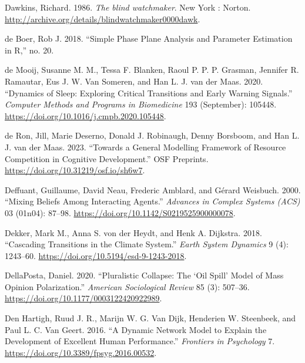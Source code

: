 \documentclass[
  a4paper,
  DIV=11,
  numbers=noendperiod,
  oneside]{scrreprt}
\newlength{\cslhangindent}
\newenvironment{CSLReferences}[2] %
 {\begin{list}{}{%
  \setlength{\itemindent}{0pt}
  \setlength{\leftmargin}{0pt}
  \setlength{\parsep}{0pt}
  \ifodd #1
   \setlength{\leftmargin}{\cslhangindent}
   \setlength{\itemindent}{-1\cslhangindent}
  \fi
  \setlength{\itemsep}{#2\baselineskip}}}
 {\end{list}}
\begin{document}
\begin{CSLReferences}{1}{0}
Dawkins, Richard. 1986. \emph{The blind watchmaker}. New York : Norton.
\url{http://archive.org/details/blindwatchmaker0000dawk}.

de Boer, Rob J. 2018. {``Simple Phase Plane Analysis and Parameter
Estimation in {R},''} no. 20.

de Mooij, Susanne M. M., Tessa F. Blanken, Raoul P. P. P. Grasman,
Jennifer R. Ramautar, Eus J. W. Van Someren, and Han L. J. van der Maas.
2020. {``Dynamics of Sleep: {Exploring} Critical Transitions and Early
Warning Signals.''} \emph{Computer Methods and Programs in Biomedicine}
193 (September): 105448.
\url{https://doi.org/10.1016/j.cmpb.2020.105448}.

de Ron, Jill, Marie Deserno, Donald J. Robinaugh, Denny Borsboom, and
Han L. J. van der Maas. 2023. {``Towards a {General Modelling Framework}
of {Resource Competition} in {Cognitive Development}.''} {OSF
Preprints}. \url{https://doi.org/10.31219/osf.io/sh6w7}.

Deffuant, Guillaume, David Neau, Frederic Amblard, and Gérard Weisbuch.
2000. {``Mixing Beliefs Among Interacting Agents.''} \emph{Advances in
Complex Systems (ACS)} 03 (01n04): 87--98.
\url{https://doi.org/10.1142/S0219525900000078}.

Dekker, Mark M., Anna S. von der Heydt, and Henk A. Dijkstra. 2018.
{``Cascading Transitions in the Climate System.''} \emph{Earth System
Dynamics} 9 (4): 1243--60.
\url{https://doi.org/10.5194/esd-9-1243-2018}.

DellaPosta, Daniel. 2020. {``Pluralistic {Collapse}: {The} {`{Oil
Spill}'} {Model} of {Mass Opinion Polarization}.''} \emph{American
Sociological Review} 85 (3): 507--36.
\url{https://doi.org/10.1177/0003122420922989}.

Den Hartigh, Ruud J. R., Marijn W. G. Van Dijk, Henderien W. Steenbeek,
and Paul L. C. Van Geert. 2016. {``A {Dynamic Network Model} to
{Explain} the {Development} of {Excellent Human Performance}.''}
\emph{Frontiers in Psychology} 7.
\url{https://doi.org/10.3389/fpsyg.2016.00532}.


\end{CSLReferences}
\end{document}
